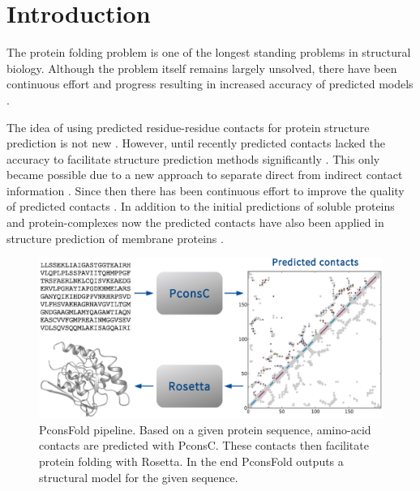 \documentclass{bioinfo}
\begin{document}
\section{Introduction}
The protein folding problem is one of the longest standing problems in
structural biology. Although the problem itself remains largely unsolved,
there have been continuous effort and progress resulting in increased
accuracy of predicted models
\cite[]{kryshtafovych_CASP10_2013}. 

The idea of using predicted residue-residue contacts for protein
structure prediction is not new \cite[]{Vendruscolo9377713}. However,
until recently predicted contacts lacked the accuracy to facilitate
structure prediction methods significantly
\cite[]{marks_protein_2011}. This only became possible due to a new
approach to separate direct from indirect contact information
\cite[]{Weigt19116270,burger_disentangling_2010}.  Since then there
has been continuous effort to improve the quality of predicted
contacts \cite[]{morcos_direct-coupling_2011, jones_PSICOV:_2012,
  ekeberg_improved_2013, skwark_PconsC:_2013}.  In addition to the
initial predictions of soluble proteins \cite[]{marks_protein_2011}
and protein-complexes \cite{Schug20018738} now the predicted contacts
have also been applied in structure prediction of membrane proteins
\cite[]{hopf_three-dimensional_2012, nugent_accurate_2012}.


\begin{figure}[!tpb]%
\centerline{\includegraphics[scale=0.35]{figures/pipeline.eps}}
\caption{PconsFold pipeline. Based on a given protein sequence,
  amino-acid contacts are predicted with PconsC. These contacts then
  facilitate protein folding with Rosetta. In the end PconsFold
  outputs a structural model for the given
  sequence.}\label{fig:pipeline} 
\end{figure}
\end{document}
